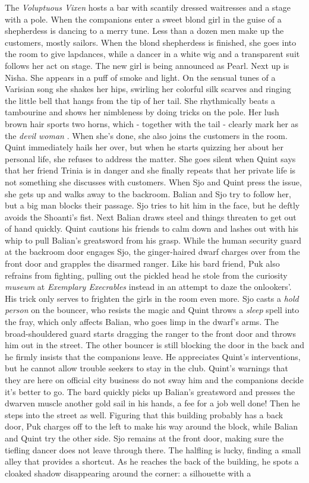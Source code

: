 The {\itshape Voluptuous Vixen} hosts a bar with scantily dressed waitresses and a stage with a pole. When the companions enter a sweet blond girl in the guise of a shepherdess is dancing to a merry tune. Less than a dozen men make up the customers, mostly sailors. When the blond shepherdess is finished, she goes into the room to give lapdances, while a dancer in a white wig and a transparent suit follows her act on stage. The new girl is being announced as Pearl. Next up is Nisha. She appears in a puff of smoke and light. On the sensual tunes of a Varisian song she shakes her hips, swirling her colorful silk scarves and ringing the little bell that hangs from the tip of her tail. She rhythmically beats a tambourine and shows her nimbleness by doing tricks on the pole. Her lush brown hair sports two horns, which - together with the tail - clearly mark her as the {\itshape devil woman} . When she's done, she also joins the customers in the room. Quint immediately hails her over, but when he starts quizzing her about her personal life, she refuses to address the matter. She goes silent when Quint says that her friend Trinia is in danger and she finally repeats that her private life is not something she discusses with customers. When Sjo and Quint press the issue, she gets up and walks away to the backroom. Balian and Sjo try to follow her, but a big man blocks their passage. Sjo tries to hit him in the face, but he deftly avoids the Shoanti's fist. Next Balian draws steel and things threaten to get out of hand quickly. Quint cautions his friends to calm down and lashes out with his whip to pull Balian's greatsword from his grasp. While the human security guard at the backroom door engages Sjo, the ginger-haired dwarf charges over from the front door and grapples the disarmed ranger. Like his bard friend, Puk also refrains from fighting, pulling out the pickled head he stole from the curiosity {\itshape museum} at  {\itshape Exemplary Execrables} instead in an attempt to daze the onlookers'. His trick only serves to frighten the girls in the room even more. Sjo casts a  {\itshape hold person} on the bouncer, who resists the magic and Quint throws a  {\itshape sleep} spell into the fray, which only affects Balian, who goes limp in the dwarf's arms. The broad-shouldered guard starts dragging the ranger to the front door and throws him out in the street. The other bouncer is still blocking the door in the back and he firmly insists that the companions leave. He appreciates Quint's interventions, but he cannot allow trouble seekers to stay in the club. Quint's warnings that they are here on official city business do not sway him and the companions decide it's better to go. The bard quickly picks up Balian's greatsword and presses the dwarven muscle another gold sail in his hands, a fee for a job well done! Then he steps into the street as well. Figuring that this building probably has a back door, Puk charges off to the left to make his way around the block, while Balian and Quint try the other side. Sjo remains at the front door, making sure the tiefling dancer does not leave through there. The halfling is lucky, finding a small alley that provides a shortcut. As he reaches the back of the building, he spots a cloaked shadow disappearing around the corner: a silhouette with a 